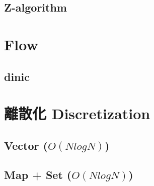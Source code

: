     \subsection{Z-algorithm}
        

\section{Flow}
    \subsection{dinic}
        

\section{離散化 Discretization}
    \subsection{Vector ($O(NlogN)$)}
        
    \subsection{Map + Set ($O(NlogN)$)}
        
